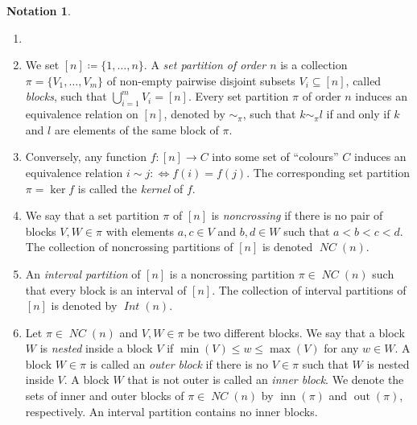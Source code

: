 \documentclass[12pt]{amsart}
\DeclareMathOperator{\IntPart}{\mathit{Int}}
\newcommand\bub[1]{\mathring{#1}}
\DeclareMathOperator{\NC}{\mathit{NC}} %
\DeclareMathOperator{\IB}{\mathrm{inn}} %
\DeclareMathOperator{\OB}{\mathrm{out}} %
\theoremstyle{definition}
\newtheorem{notation}[theorem]{Notation}
\numberwithin{equation}{section}
\begin{document}
\begin{notation}
  \begin{enumerate}[label=(\roman*), leftmargin=2em]
   \item []
   \item We set $[n]\coloneqq\{1,\ldots,n\}$.
    A \emph{set partition of order $n$}
    is a collection     $\pi=\{V_1,\ldots,V_m\}$
    of non-empty pairwise disjoint subsets 
    $V_i\subseteq [n]$, called \emph{blocks},
    such that $\bigcup_{i=1}^m V_i = [n]$.
    Every set partition $\pi$ of order $n$ induces an equivalence relation
    on $[n]$, denoted by $\sim_\pi$,
    such that  $k\sim_\pi    l$ if and only if $k$ and $l$ are elements of the
    same block of $\pi$.
   \item Conversely, any function $f:[n]\to C$  into some set of ``colours''
    $C$ induces an equivalence relation $i\sim j:\iff{} f(i)=f(j)$.
    The corresponding set partition $\pi=\ker f$ is called
    the \emph{kernel} of $f$.
   \item We say that a set partition $\pi$ of $[n]$ is
    \emph{noncrossing} if there is no pair of  blocks $V,W\in \pi$ with
    elements $a,c\in V$ and $b,d\in W$ such that $a<b<c<d$. The collection of
    noncrossing partitions of $[n]$ is denoted $\NC(n)$.  
   \item An \emph{interval partition} of $[n]$ is a noncrossing partition
    $\pi\in \NC(n)$ such that every block is an  interval of $[n]$. The
    collection of interval partitions of $[n]$ is denoted by $\IntPart(n)$. 
   \item Let $\pi\in \NC(n)$ and $V,W\in \pi$ be two different blocks.
    We say  that a block
    $W$ is \emph{nested} inside a block $V$
    if $\min(V)\leq w\leq  \max(V)$ for any $w\in
    W$. A block $W\in \pi$ is called an \emph{outer block} if there is no $V\in
    \pi$ such that $W$ is nested inside $V$. A block $W$ that is not outer is called an
    \emph{inner block}.  We denote the sets of inner and outer blocks of
    $\pi\in \NC(n)$ by $\IB(\pi)$ and $\OB(\pi)$, respectively. An interval
    partition contains no inner blocks. 

\end{enumerate}
\end{notation}
\end{document}
